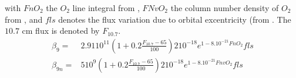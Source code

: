 %
with $FnO_2$ the $O_2$ line integral from , $FNvO_2$
the column number density of $O_2$ from , and $fls$
denotes the flux variation due to orbital excentricity (from
. The $10.7$ cm flux is denoted by $F_{10.7}$.
%
\begin{align}
  \beta_9 = &2.91 10^{11}(1 + 0.2  \frac{F_{10.7} -65}{100}) 2 10^{-18}e^{1-8.10^{-21}FnO_2}fls \\
  \beta_{9n} = &5 10^{9}(1 + 0.2  \frac{F_{10.7} -65}{100}) 2 10^{-18}e^{1-8.10^{-21}FnvO_2}fls \\
\end{align}
%
